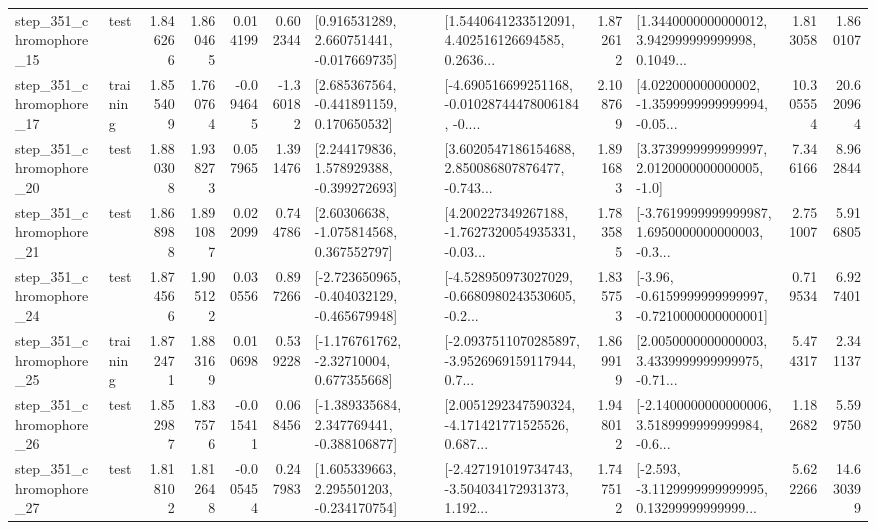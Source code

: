 \begin{tabular}{llrrrrllrlrr}
  step\_351\_chromophore\_15 &      test &      1.846266 &    1.860465 &      0.014199 &  0.602344 &    [0.916531289, 2.660751441, -0.017669735] &  [1.5440641233512091, 4.402516126694585, 0.2636... &       1.872612 &  [1.3440000000000012, 3.942999999999998, 0.1049... &            1.813058 &          1.860107 \\
  step\_351\_chromophore\_17 &  training &      1.855409 &    1.760764 &     -0.094645 & -1.360182 &    [2.685367564, -0.441891159, 0.170650532] &  [-4.690516699251168, -0.01028744478006184, -0.... &       2.108769 &  [4.022000000000002, -1.3599999999999994, -0.05... &           10.305554 &         20.620964 \\
  step\_351\_chromophore\_20 &      test &      1.880308 &    1.938273 &      0.057965 &  1.391476 &    [2.244179836, 1.578929388, -0.399272693] &  [3.6020547186154688, 2.850086807876477, -0.743... &       1.891683 &     [3.3739999999999997, 2.0120000000000005, -1.0] &            7.346166 &          8.962844 \\
  step\_351\_chromophore\_21 &      test &      1.868988 &    1.891087 &      0.022099 &  0.744786 &     [2.60306638, -1.075814568, 0.367552797] &  [4.200227349267188, -1.7627320054935331, -0.03... &       1.783585 &  [-3.7619999999999987, 1.6950000000000003, -0.3... &            2.751007 &          5.916805 \\
  step\_351\_chromophore\_24 &      test &      1.874566 &    1.905122 &      0.030556 &  0.897266 &  [-2.723650965, -0.404032129, -0.465679948] &  [-4.528950973027029, -0.6680980243530605, -0.2... &       1.835753 &  [-3.96, -0.6159999999999997, -0.7210000000000001] &            0.719534 &          6.927401 \\
  step\_351\_chromophore\_25 &  training &      1.872471 &    1.883169 &      0.010698 &  0.539228 &    [-1.176761762, -2.32710004, 0.677355668] &  [-2.0937511070285897, -3.9526969159117944, 0.7... &       1.869919 &  [2.0050000000000003, 3.4339999999999975, -0.71... &            5.474317 &          2.341137 \\
  step\_351\_chromophore\_26 &      test &      1.852987 &    1.837576 &     -0.015411 &  0.068456 &   [-1.389335684, 2.347769441, -0.388106877] &  [2.0051292347590324, -4.171421771525526, 0.687... &       1.948012 &  [-2.1400000000000006, 3.5189999999999984, -0.6... &            1.182682 &          5.599750 \\
  step\_351\_chromophore\_27 &      test &      1.818102 &    1.812648 &     -0.005454 &  0.247983 &    [1.605339663, 2.295501203, -0.234170754] &  [-2.427191019734743, -3.504034172931373, 1.192... &       1.747512 &  [-2.593, -3.1129999999999995, 0.13299999999999... &            5.622266 &         14.630399 \\

\end{tabular}
